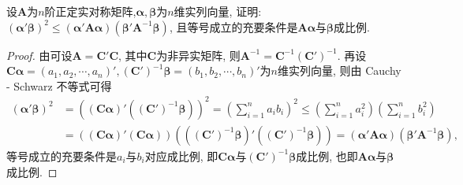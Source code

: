 \documentclass[../../main.tex]{subfiles}
\begin{document}
\begin{example}
设$\boldsymbol{A}$为$n$阶正定实对称矩阵,$\boldsymbol{\alpha}, \boldsymbol{\beta}$为$n$维实列向量, 证明: $(\boldsymbol{\alpha}'\boldsymbol{\beta})^2\leq (\boldsymbol{\alpha}'\boldsymbol{A}\boldsymbol{\alpha})(\boldsymbol{\beta}'\boldsymbol{A}^{-1}\boldsymbol{\beta})$, 且等号成立的充要条件是$\boldsymbol{A}\boldsymbol{\alpha}$与$\boldsymbol{\beta}$成比例.
\end{example}
\begin{proof}
由可设$\boldsymbol{A}=\boldsymbol{C}'\boldsymbol{C}$, 其中$\boldsymbol{C}$为非异实矩阵, 则$\boldsymbol{A}^{-1}=\boldsymbol{C}^{-1}(\boldsymbol{C}')^{-1}$. 再设$\boldsymbol{C}\boldsymbol{\alpha}=(a_1, a_2, \cdots, a_n)', (\boldsymbol{C}')^{-1}\boldsymbol{\beta}=(b_1, b_2, \cdots, b_n)'$为$n$维实列向量, 则由 Cauchy - Schwarz 不等式可得
\begin{align*}
(\boldsymbol{\alpha}'\boldsymbol{\beta})^2 
&= ((\boldsymbol{C}\boldsymbol{\alpha})'((\boldsymbol{C}')^{-1}\boldsymbol{\beta}))^2 = \left(\sum_{i = 1}^n a_ib_i\right)^2\leq \left(\sum_{i = 1}^n a_i^2\right)\left(\sum_{i = 1}^n b_i^2\right)\\
&= ((\boldsymbol{C}\boldsymbol{\alpha})'(\boldsymbol{C}\boldsymbol{\alpha}))((( \boldsymbol{C}')^{-1}\boldsymbol{\beta})'((\boldsymbol{C}')^{-1}\boldsymbol{\beta})) = (\boldsymbol{\alpha}'\boldsymbol{A}\boldsymbol{\alpha})(\boldsymbol{\beta}'\boldsymbol{A}^{-1}\boldsymbol{\beta}),
\end{align*}
等号成立的充要条件是$a_i$与$b_i$对应成比例, 即$\boldsymbol{C}\boldsymbol{\alpha}$与$(\boldsymbol{C}')^{-1}\boldsymbol{\beta}$成比例, 也即$\boldsymbol{A}\boldsymbol{\alpha}$与$\boldsymbol{\beta}$成比例. 
\end{proof}
\end{document}
